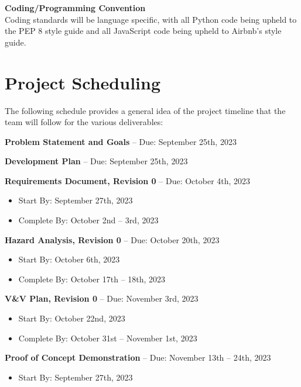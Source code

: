 \documentclass{article}
\begin{document}
\noindent \textbf{Coding/Programming Convention} \\
Coding standards will be language specific, with all Python code being upheld to the PEP 8 style guide and all JavaScript code being upheld to Airbnb’s style guide.

\section{Project Scheduling}

The following schedule provides a general idea of the project timeline that the team will follow for the various deliverables:

\begin{itemize}
\begin{item}
\textbf{Problem Statement and Goals} – Due: September 25th, 2023
\end{item}
\begin{item}
\textbf{Development Plan} – Due: September 25th, 2023
\end{item}
\begin{item}
\textbf{Requirements Document, Revision 0} – Due: October 4th, 2023
\begin{itemize}
\item Start By: September 27th, 2023
\item Complete By: October 2nd – 3rd, 2023
\end{itemize}
\end{item}
\begin{item}
\textbf{Hazard Analysis, Revision 0} – Due: October 20th, 2023
\begin{itemize}
\item Start By: October 6th, 2023
\item Complete By: October 17th – 18th, 2023
\end{itemize}
\end{item}
\begin{item}
\textbf{V\&V Plan, Revision 0} – Due: November 3rd, 2023
\begin{itemize}
\item Start By: October 22nd, 2023
\item Complete By: October 31st – November 1st, 2023
\end{itemize}
\end{item}
\begin{item}
\textbf{Proof of Concept Demonstration} – Due: November 13th – 24th, 2023
\begin{itemize}
\item Start By: September 27th, 2023

\end{itemize}
\end{item}
\end{itemize}
\end{document}
